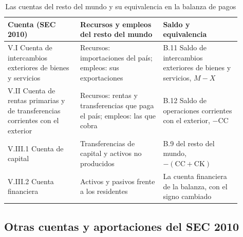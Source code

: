 \documentclass[11pt]{article}
\begin{document}
\begin{table}[H]
\centering
\caption{Las cuentas del resto del mundo y su equivalencia en la balanza de pagos}\label{tab:resto-mundo}
\renewcommand{\arraystretch}{1.2}
\small
\begin{tabular}{>{\raggedright\arraybackslash}m{0.28\linewidth}>{\raggedright\arraybackslash}m{0.32\linewidth}>{\raggedright\arraybackslash}m{0.3\linewidth}}
\toprule
\rowcolor{tceeazulpalido}
\textbf{Cuenta (SEC 2010)} & \textbf{Recursos y empleos del resto del mundo} & \textbf{Saldo y equivalencia} \\
\midrule
V.I Cuenta de intercambios exteriores de bienes y servicios & Recursos: importaciones del país; empleos: sus exportaciones & B.11 Saldo de intercambios exteriores de bienes y servicios, $M-X$ \\
V.II Cuenta de rentas primarias y de transferencias corrientes con el exterior & Recursos: rentas y transferencias que paga el país; empleos: las que cobra & B.12 Saldo de operaciones corrientes con el exterior, $-\mathrm{CC}$ \\
V.III.1 Cuenta de capital & Transferencias de capital y activos no producidos & B.9 del resto del mundo, $-(\mathrm{CC}+\mathrm{CK})$ \\
V.III.2 Cuenta financiera & Activos y pasivos frente a los residentes & La cuenta financiera de la balanza, con el signo cambiado \\
\bottomrule
\end{tabular}
\end{table}

\subsection{Otras cuentas y aportaciones del SEC 2010}\label{sec:otras-cuentas}
\end{document}
